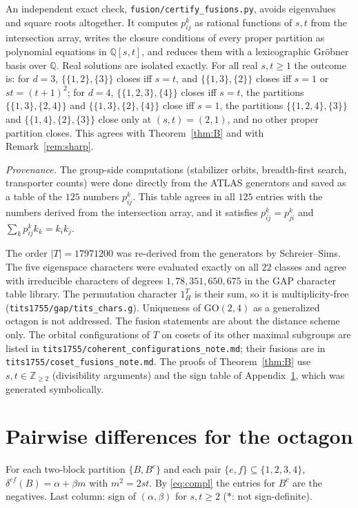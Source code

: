 \documentclass[11pt]{article}
\theoremstyle{remark}
\begin{document}
An independent exact check, \texttt{fusion/certify\_fusions.py}, avoids eigenvalues and square roots altogether. It computes $p_{ij}^k$ as rational functions of $s,t$ from the intersection array, writes the closure conditions of every proper partition as polynomial equations in $\mathbb Q[s,t]$, and reduces them with a lexicographic Gr\"obner basis over $\mathbb Q$. Real solutions are isolated exactly. For all real $s,t\ge1$ the outcome is: for $d=3$, $\{\{1,2\},\{3\}\}$ closes iff $s=t$, and $\{\{1,3\},\{2\}\}$ closes iff $s=1$ or $st=(t+1)^2$; for $d=4$, $\{\{1,2,3\},\{4\}\}$ closes iff $s=t$, the partitions $\{\{1,3\},\{2,4\}\}$ and $\{\{1,3\},\{2\},\{4\}\}$ close iff $s=1$, the partitions $\{\{1,2,4\},\{3\}\}$ and $\{\{1,4\},\{2\},\{3\}\}$ close only at $(s,t)=(2,1)$, and no other proper partition closes. This agrees with Theorem~\ref{thm:B} and with Remark~\ref{rem:sharp}.

\emph{Provenance.} The group-side computations (stabilizer orbits, breadth-first search, transporter counts) were done directly from the ATLAS generators and saved as a table of the $125$ numbers $p_{ij}^k$. This table agrees in all $125$ entries with the numbers derived from the intersection array, and it satisfies $p_{ij}^k=p_{ji}^k$ and $\sum_kp_{ij}^kk_k=k_ik_j$.

The order $|T|=17971200$ was re-derived from the generators by Schreier--Sims. The five eigenspace characters were evaluated exactly on all $22$ classes and agree with irreducible characters of degrees $1,78,351,650,675$ in the GAP character table library. The permutation character $1_H^T$ is their sum, so it is multiplicity-free (\texttt{tits1755/gap/tits\_chars.g}). Uniqueness of $\mathrm{GO}(2,4)$ as a generalized octagon is not addressed. The fusion statements are about the distance scheme only. The orbital configurations of $T$ on cosets of its other maximal subgroups are listed in \texttt{tits1755/coherent\_configurations\_note.md}; their fusions are in \texttt{tits1755/coset\_fusions\_note.md}. The proofs of Theorem~\ref{thm:B} use $s,t\in\mathbb Z_{\ge2}$ (divisibility arguments) and the sign table of Appendix~\ref{app:table}, which was generated symbolically.

\appendix
\section{Pairwise differences for the octagon}\label{app:table}
For each two-block partition $\{B,B^c\}$ and each pair $\{e,f\}\subseteq\{1,2,3,4\}$, $\delta^{ef}(B)=\alpha+\beta m$ with $m^2=2st$. By \eqref{eq:compl} the entries for $B^c$ are the negatives. Last column: sign of $(\alpha,\beta)$ for $s,t\ge2$ ($\ast$: not sign-definite).
\end{document}
